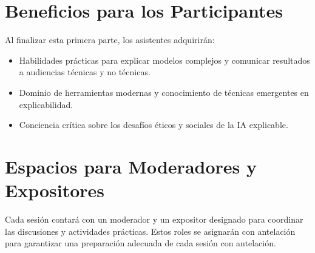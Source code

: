 \section*{Beneficios para los Participantes}
Al finalizar esta primera parte, los asistentes adquirirán:
\begin{itemize}
    \item Habilidades prácticas para explicar modelos complejos y comunicar resultados a audiencias técnicas y no técnicas.
    \item Dominio de herramientas modernas y conocimiento de técnicas emergentes en explicabilidad.
    \item Conciencia crítica sobre los desafíos éticos y sociales de la IA explicable.
\end{itemize}

\section*{Espacios para Moderadores y Expositores}
Cada sesión contará con un moderador y un expositor designado para coordinar las discusiones y actividades prácticas. Estos roles se asignarán con antelación para garantizar una preparación adecuada de cada sesión con antelación.
